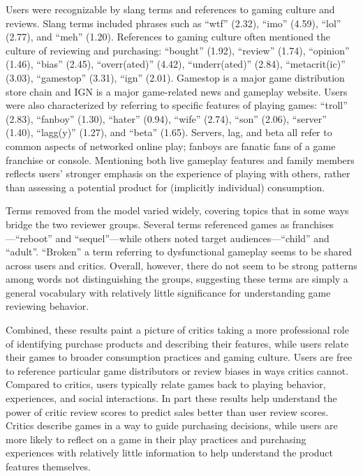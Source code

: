 \documentclass[letterpaper]{article}
\begin{document}
Users were recognizable by slang terms and references to gaming culture and reviews. Slang terms included phrases such as ``wtf'' (2.32), ``imo'' (4.59), ``lol'' (2.77), and ``meh'' (1.20). References to gaming culture often mentioned the culture of reviewing and purchasing: ``bought'' (1.92), ``review'' (1.74), ``opinion'' (1.46), ``bias'' (2.45), ``overr(ated)'' (4.42), ``underr(ated)'' (2.84), ``metacrit(ic)'' (3.03), ``gamestop'' (3.31), ``ign'' (2.01). Gamestop is a major game distribution store chain and IGN is a major game-related news and gameplay website. Users were also characterized by referring to specific features of playing games: ``troll'' (2.83), ``fanboy'' (1.30), ``hater'' (0.94), ``wife'' (2.74), ``son'' (2.06), ``server'' (1.40), ``lagg(y)'' (1.27), and ``beta'' (1.65). Servers, lag, and beta all refer to common aspects of networked online play; fanboys are fanatic fans of a game franchise or console. Mentioning both live gameplay features and family members reflects users' stronger emphasis on the experience of playing with others, rather than assessing a potential product for (implicitly individual) consumption.

Terms removed from the model varied widely, covering topics that in some ways bridge the two reviewer groups. Several terms referenced games as franchises---``reboot'' and ``sequel''---while others noted target audiences---``child'' and ``adult''. ``Broken'' a term referring to dysfunctional gameplay seems to be shared across users and critics. Overall, however, there do not seem to be strong patterns among words not distinguishing the groups, suggesting these terms are simply a general vocabulary with relatively little significance for understanding game reviewing behavior.


Combined, these results paint a picture of critics taking a more professional role of identifying purchase products and describing their features, while users relate their games to broader consumption practices and gaming culture. Users are free to reference particular game distributors or review biases in ways critics cannot. Compared to critics, users typically relate games back to playing behavior, experiences, and social interactions. In part these results help understand the power of critic review scores to predict sales better than user review scores. Critics describe games in a way to guide purchasing decisions, while users are more likely to reflect on a game in their play practices and purchasing experiences with relatively little information to help understand the product features themselves.
\end{document}
